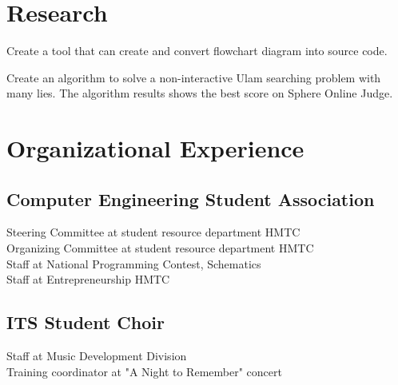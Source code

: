 \documentclass[letterpaper]{deedy-resume} %
\begin{document}
\hfill
\begin{minipage}[t]{0.59\textwidth} %


\section{Research}

Create a tool that can create and convert flowchart diagram into source code.
\sectionspace

Create an algorithm to solve a non-interactive Ulam searching problem with many lies. The algorithm results shows the best score on Sphere Online Judge.
\sectionspace


\section{Organizational Experience}

\subsection{Computer Engineering Student Association}
  Steering Committee at student resource department HMTC \\
  Organizing Committee at student resource department HMTC \\
  Staff at National Programming Contest, Schematics \\
  Staff at Entrepreneurship HMTC \\
\sectionspace

\subsection{ITS Student Choir}
  Staff at Music Development Division \\
  Training coordinator at "A Night to Remember" concert \\
\sectionspace

\end{minipage} %
\end{document}
